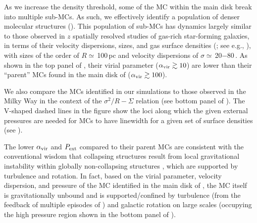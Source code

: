 \IfFileExists{emulateapjlegacy.cls}{\documentclass[iop]{emulateapjlegacy}}{\documentclass[iop]{emulateapj}}
\begin{document}
As we increase the density threshold, some of the MC within the main disk break
into multiple sub-MCs.
As such, we effectively identify a population of denser molecular structures ().
This population of sub-MCs has dynamics largely
similar to those observed
in $z$ spatially resolved studies of gas-rich star-forming galaxies, in
terms of their velocity dispersions, sizes, and gas surface densities (; see
e.g., \citealt{Swinbank11a}),
with sizes of the order of $R\simeq$\,100\,pc and velocity
dispersions of $\sigma\simeq$\,20$-$80\,\kms. 
As shown in the top panel of , their virial parameter ($\alpha_{\rm vir}\gtrsim10$)
are lower than their ``parent'' MCs found in the main disk of \flower ($\alpha_{\rm vir}\gtrsim100$). 

We also compare the MCs identified in our simulations to 
those observed in the Milky Way in the context of the $\sigma^2/R - \Sigma$ relation (see bottom panel of 
). The V-shaped dashed lines in the figure show the loci along which the given external pressures are needed for 
MCs to have linewidth for a given set of surface densities (see ). 

The lower $\alpha_{\rm vir}$ and $P_{\rm ext}$ compared to their parent MCs are consistent with
the conventional wisdom that collapsing structures result from local gravitational
instability within globally non-collapsing structures \citep[see e.g.,][]{Ballesteros-Paredes11a},
which are supported by turbulence and rotation. 
In fact, based on the virial parameter, velocity dispersion, and pressure of the MC identified in the main disk of \flower, 
the MC itself is gravitationally unbound and is supported/confined 
by turbulence (from the feedback of multiple episodes of \SF) 
and galactic rotation on large scales (occupying the high pressure region shown in the bottom panel of ).
\end{document}
